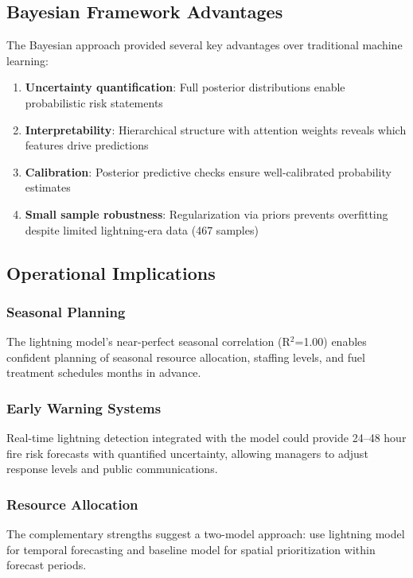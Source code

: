 \documentclass[11pt,a4paper]{article}
\begin{document}
\subsection{Bayesian Framework Advantages}

The Bayesian approach provided several key advantages over traditional machine learning:

\begin{enumerate}
    \item \textbf{Uncertainty quantification}: Full posterior distributions enable probabilistic risk statements
    \item \textbf{Interpretability}: Hierarchical structure with attention weights reveals which features drive predictions
    \item \textbf{Calibration}: Posterior predictive checks ensure well-calibrated probability estimates
    \item \textbf{Small sample robustness}: Regularization via priors prevents overfitting despite limited lightning-era data (467 samples)
\end{enumerate}

\subsection{Operational Implications}

\subsubsection{Seasonal Planning}
The lightning model's near-perfect seasonal correlation (R$^2$=1.00) enables confident planning of seasonal resource allocation, staffing levels, and fuel treatment schedules months in advance.

\subsubsection{Early Warning Systems}
Real-time lightning detection integrated with the model could provide 24--48 hour fire risk forecasts with quantified uncertainty, allowing managers to adjust response levels and public communications.

\subsubsection{Resource Allocation}
The complementary strengths suggest a two-model approach: use lightning model for temporal forecasting and baseline model for spatial prioritization within forecast periods.
\end{document}

